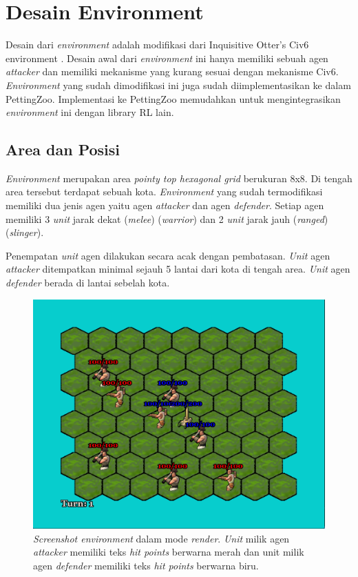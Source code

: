 \section{Desain Environment}
Desain dari \emph{environment} adalah modifikasi dari Inquisitive Otter's Civ6 environment \citep{civ6Environment}. 
Desain awal dari \emph{environment} ini hanya memiliki sebuah agen \emph{attacker} dan memiliki mekanisme yang kurang sesuai dengan mekanisme Civ6.
\emph{Environment} yang sudah dimodifikasi ini juga sudah diimplementasikan ke dalam PettingZoo.
Implementasi ke PettingZoo memudahkan untuk mengintegrasikan \emph{environment} ini dengan library RL lain.

\subsection{Area dan Posisi}
\emph{Environment} merupakan area \emph{pointy top hexagonal grid} berukuran 8x8. Di tengah area tersebut terdapat sebuah kota.
\emph{Environment} yang sudah termodifikasi memiliki dua jenis agen yaitu agen \emph{attacker} dan agen \emph{defender}.
Setiap agen memiliki 3 \emph{unit} jarak dekat (\emph{melee}) (\emph{warrior}) dan 2 \emph{unit} jarak jauh (\emph{ranged}) (\emph{slinger}).

Penempatan \emph{unit} agen dilakukan secara acak dengan pembatasan.
\emph{Unit} agen \emph{attacker} ditempatkan minimal sejauh 5 lantai dari kota di tengah area.
\emph{Unit} agen \emph{defender} berada di lantai sebelah kota.


\begin{figure}[H]
  \centering
    \includegraphics[scale=0.3]{gambar/environment_screenshot.png}
    \caption{\emph{Screenshot environment} dalam mode \emph{render}. \emph{Unit} milik agen \emph{attacker} memiliki teks \emph{hit points} berwarna merah dan unit milik agen \emph{defender} memiliki teks \emph{hit points} berwarna biru.}
    \label{fig:environmentScreenshot}
\end{figure}

